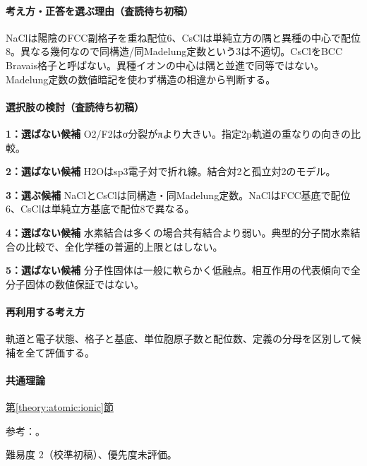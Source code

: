 \paragraph{考え方・正答を選ぶ理由（査読待ち初稿）} NaClは陽陰のFCC副格子を重ね配位6、CsClは単純立方の隅と異種の中心で配位8。異なる幾何なので同構造/同Madelung定数という3は不適切。CsClをBCC Bravais格子と呼ばない。異種イオンの中心は隅と並進で同等ではない。Madelung定数の数値暗記を使わず構造の相違から判断する。

\paragraph{選択肢の検討（査読待ち初稿）}\mbox{}\par

\noindent\textbf{1：選ばない候補} O2/F2はσ分裂がπより大きい。指定2p軌道の重なりの向きの比較。\par

\noindent\textbf{2：選ばない候補} H2Oはsp3電子対で折れ線。結合対2と孤立対2のモデル。\par

\noindent\textbf{3：選ぶ候補} NaClとCsClは同構造・同Madelung定数。NaClはFCC基底で配位6、CsClは単純立方基底で配位8で異なる。\par

\noindent\textbf{4：選ばない候補} 水素結合は多くの場合共有結合より弱い。典型的分子間水素結合の比較で、全化学種の普遍的上限とはしない。\par

\noindent\textbf{5：選ばない候補} 分子性固体は一般に軟らかく低融点。相互作用の代表傾向で全分子固体の数値保証ではない。\par

\paragraph{再利用する考え方} 軌道と電子状態、格子と基底、単位胞原子数と配位数、定義の分母を区別して候補を全て評価する。

\paragraph{共通理論} \hyperref[theory:atomic:ionic]{第\ref*{theory:atomic:ionic}節}

\par 参考：\cite{openstax_crystals}。

\par 難易度 2（校準初稿）、優先度未評価。

